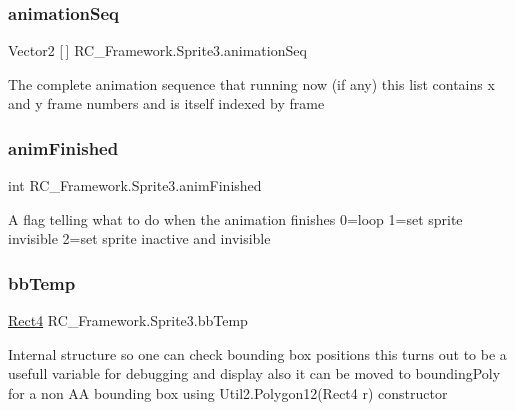 \subsubsection{\texorpdfstring{animation\+Seq}{animationSeq}}
{\footnotesize\ttfamily Vector2 \mbox{[}$\,$\mbox{]} R\+C\+\_\+\+Framework.\+Sprite3.\+animation\+Seq\hspace{0.3cm}{\ttfamily [protected]}}



The complete animation sequence that running now (if any) this list contains x and y frame numbers and is itself indexed by frame 

\mbox{\label{class_r_c___framework_1_1_sprite3_adcc42561b39149028339909953eabe4a}} 
\subsubsection{\texorpdfstring{anim\+Finished}{animFinished}}
{\footnotesize\ttfamily int R\+C\+\_\+\+Framework.\+Sprite3.\+anim\+Finished\hspace{0.3cm}{\ttfamily [protected]}}



A flag telling what to do when the animation finishes 0=loop 1=set sprite invisible 2=set sprite inactive and invisible 

\mbox{\label{class_r_c___framework_1_1_sprite3_a4fedf0e3c61d7960064f3588a9cc8a93}} 
\subsubsection{\texorpdfstring{bb\+Temp}{bbTemp}}
{\footnotesize\ttfamily \mbox{\hyperlink{class_r_c___framework_1_1_rect4}{Rect4}} R\+C\+\_\+\+Framework.\+Sprite3.\+bb\+Temp}



Internal structure so one can check bounding box positions this turns out to be a usefull variable for debugging and display also it can be moved to bounding\+Poly for a non AA bounding box using Util2.\+Polygon12(\+Rect4 r) constructor 

